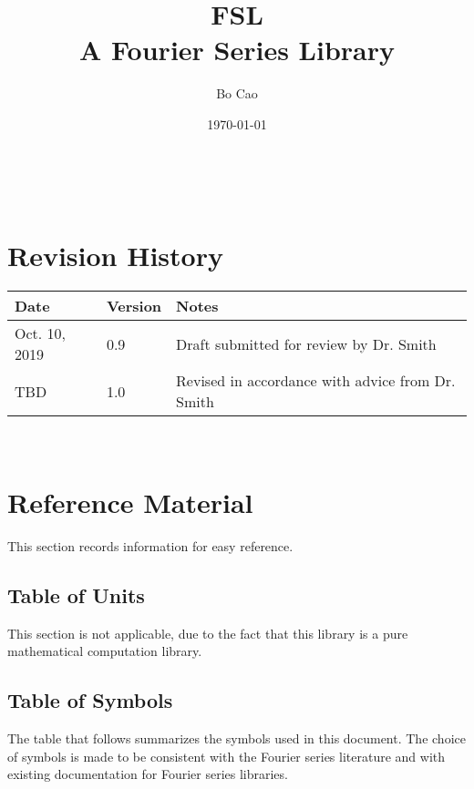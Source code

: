 \documentclass[12pt]{article}
\newcommand{\famname}{FSL} %
\begin{document}
\title{\famname\\A Fourier Series Library} 
\author{Bo Cao}
\date{\today}

\maketitle

~\newpage


\section{Revision History}

\begin{tabularx}{\textwidth}{p{3cm}p{2cm}X}
\toprule {\bf Date} & {\bf Version} & {\bf Notes}\\
\midrule
Oct. 10, 2019 & 0.9 & Draft submitted for review by Dr. Smith\\
TBD & 1.0 & Revised in accordance with advice from Dr. Smith\\
\bottomrule
\end{tabularx}

~\newpage
	
\section{Reference Material}

This section records information for easy reference.

\subsection{Table of Units}

This section is not applicable, due to the fact that this library is a pure mathematical computation library.


\subsection{Table of Symbols}

The table that follows summarizes the symbols used in this document. 
The choice of symbols is made to be consistent with the Fourier 
series literature and with existing documentation for Fourier series 
libraries.
\end{document}
